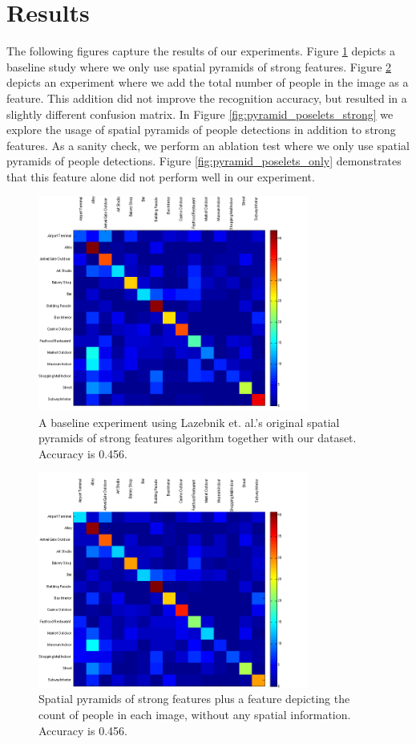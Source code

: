 \documentclass[11pt]{article}
\begin{document}
\section{Results}

The following figures capture the results of our experiments. Figure \ref{fig:strong} depicts a baseline study where we only use spatial pyramids of strong features. Figure \ref{fig:poselets_strong} depicts an experiment where we add the total number of people in the image as a feature. This addition did not improve the recognition accuracy, but resulted in a slightly different confusion matrix. In Figure \ref{fig:pyramid_poselets_strong} we explore the usage of spatial pyramids of people detections in addition to strong features. As a sanity check, we perform an ablation test where we only use spatial pyramids of people detections. Figure \ref{fig:pyramid_poselets_only} demonstrates that this feature alone did not perform well in our experiment.

\begin{figure}[p]
 \centering
\includegraphics[width=3.5in]{images/Strong_features.png}
 \caption{A baseline experiment using Lazebnik et. al.'s original spatial pyramids of strong features algorithm together with our dataset. Accuracy is 0.456.}
 \label{fig:strong}
\end{figure}

\begin{figure}[p]
 \centering
\includegraphics[width=3.5in]{images/Poselets_and_strong_features.png}
 \caption{Spatial pyramids of strong features plus a feature depicting the count of people in each image, without any spatial information. Accuracy is 0.456.}
 \label{fig:poselets_strong}
\end{figure}
\end{document}
